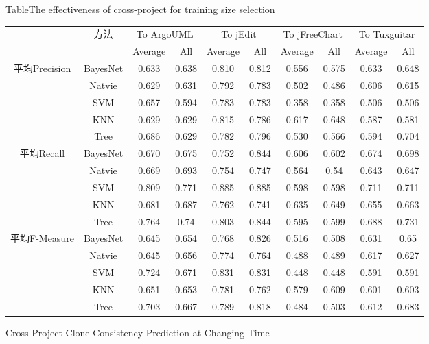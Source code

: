 \begin{sidewaystable} [htbp]
{Table$\!$}{The effectiveness of cross-project for training size selection}
\vspace{0.5em}
\centering
\wuhao
\begin{tabular}{cccccccccc}
\toprule[1.5pt]
~\multirow{2}{*}{度量}&\multirow{2}{*}{方法}&\multicolumn{2}{c}{To ArgoUML}&\multicolumn{2}{c}{To jEdit}&\multicolumn{2}{c}{To jFreeChart}&\multicolumn{2}{c}{To  Tuxguitar}\\
\cline{3-10}
~&~&{Average}&{All}&{Average}&{All}&{Average}&{All}&{Average}&{All}\\
\midrule[1pt]
\multirow{5}{*}{平均Precision}
&BayesNet&0.633&0.638&0.810&	0.812&0.556&0.575&0.633&0.648\\
&Natvie&0.629&0.631&0.792&0.783&0.502&0.486&	0.606&0.615\\
&SVM&0.657&0.594&0.783&0.783&	0.358&0.358&0.506&	0.506\\
&KNN&0.629&0.629&0.815&0.786&	0.617&0.648&0.587&	0.581\\
&Tree&0.686&	0.629&0.782&0.796&	0.530&0.566&0.594&0.704\\
\hline
\multirow{5}{*}{平均Recall}															
&BayesNet&0.670&0.675&	0.752&0.844&	0.606&0.602&	0.674&0.698\\
&Natvie&0.669&0.693&	0.754&0.747&	0.564&0.54&0.643&0.647\\
&SVM&	0.809&0.771&0.885&	0.885&0.598&0.598&0.711&0.711\\
&KNN&	0.681&0.687&0.762&0.741&0.635&0.649&0.655&	0.663\\
&Tree	&0.764&	0.74&	0.803&0.844&0.595&	0.599&0.688&0.731\\
\hline
\multirow{5}{*}{平均F-Measure}					
&BayesNet&0.645&0.654&	0.768&0.826&0.516&0.508&0.631&0.65\\
&Natvie&0.645&0.656&	0.774&0.764	&0.488&	0.489	&0.617&0.627\\
&SVM&	0.724&0.671&0.831&	0.831&0.448&0.448&	0.591&0.591\\
&KNN&	0.651&0.653&0.781&	0.762&0.579	&0.609&	0.601	&0.603\\
&Tree	&0.703&	0.667&0.789&0.818&	0.484	&0.503&	0.612	&0.683\\
\bottomrule[1.5pt]
\end{tabular}
\end{sidewaystable}

{Cross-Project Clone Consistency Prediction at Changing Time}


